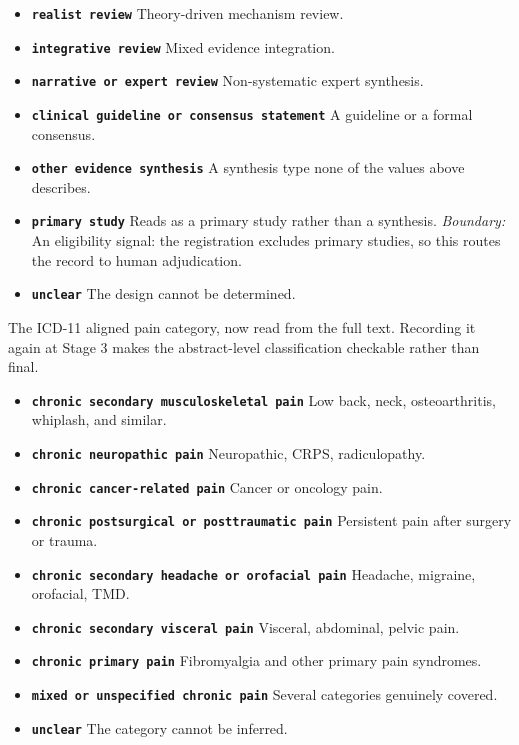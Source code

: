 \documentclass[11pt]{article}
\begin{document}
\begin{description}
\begin{itemize}[leftmargin=1.3em,itemsep=2pt,topsep=2pt]
  \item \textbf{\texttt{realist review}} Theory-driven mechanism review.
  \item \textbf{\texttt{integrative review}} Mixed evidence integration.
  \item \textbf{\texttt{narrative or expert review}} Non-systematic expert synthesis.
  \item \textbf{\texttt{clinical guideline or consensus statement}} A guideline or a formal consensus.
  \item \textbf{\texttt{other evidence synthesis}} A synthesis type none of the values above describes.
  \item \textbf{\texttt{primary study}} Reads as a primary study rather than a synthesis. {\small \textit{Boundary:} An eligibility signal: the registration excludes primary studies, so this routes the record to human adjudication.}
  \item \textbf{\texttt{unclear}} The design cannot be determined.
  \end{itemize}
\item[\texttt{icd11\_pain\_category}] The ICD-11 aligned pain category, now read from the full text. Recording it again at Stage 3 makes the abstract-level classification checkable rather than final.
  \begin{itemize}[leftmargin=1.3em,itemsep=2pt,topsep=2pt]
  \item \textbf{\texttt{chronic secondary musculoskeletal pain}} Low back, neck, osteoarthritis, whiplash, and similar.
  \item \textbf{\texttt{chronic neuropathic pain}} Neuropathic, CRPS, radiculopathy.
  \item \textbf{\texttt{chronic cancer-related pain}} Cancer or oncology pain.
  \item \textbf{\texttt{chronic postsurgical or posttraumatic pain}} Persistent pain after surgery or trauma.
  \item \textbf{\texttt{chronic secondary headache or orofacial pain}} Headache, migraine, orofacial, TMD.
  \item \textbf{\texttt{chronic secondary visceral pain}} Visceral, abdominal, pelvic pain.
  \item \textbf{\texttt{chronic primary pain}} Fibromyalgia and other primary pain syndromes.
  \item \textbf{\texttt{mixed or unspecified chronic pain}} Several categories genuinely covered.
  \item \textbf{\texttt{unclear}} The category cannot be inferred.

\end{itemize}
\end{description}
\end{document}
